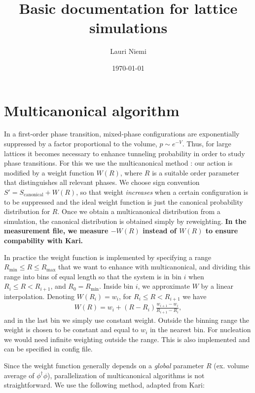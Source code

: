 \documentclass[11pt,a4paper]{article}
\title{Basic documentation for lattice simulations}
\author{Lauri Niemi}
\date{\today}
\newcommand\lauri[1]{{\color{myorange}#1}}
\begin{document}
\maketitle


\section{Multicanonical algorithm}

In a first-order phase transition, mixed-phase configurations are exponentially suppressed by a factor proportional to the volume, $p \sim e^{-V}$. Thus, for large lattices it becomes necessary to enhance tunneling probability in order to study phase transitions. For this we use the multicanonical method \cite{Berg:1991cf}: our action is modified by a weight function $W(R)$, where $R$ is a suitable order parameter that distinguishes all relevant phases. We choose sign convention $S' = S_\text{canonical} + W(R)$, so that weight \textit{increases} when a certain configuration is to be suppressed and the ideal weight function is just the canonical probability distribution for $R$. Once we obtain a multicanonical distribution from a simulation, the canonical distribution is obtained simply by reweighting. \textbf{In the measurement file, we measure $-W(R)$ instead of $W(R)$ to ensure compability with Kari.}

In practice the weight function is implemented by specifying a range $R_\text{min} \leq R \leq R_\text{max}$ that we want to enhance with multicanonical, and dividing this range into bins of equal length so that the system is in bin $i$ when $R_{i} \leq R < R_{i+1}$, and $R_0 = R_\text{min}$. Inside bin $i$, we approximate $W$ by a linear interpolation. Denoting $W(R_i) = w_i$, for $R_{i} \leq R < R_{i+1}$ we have 
\begin{align}
W(R) = w_i + (R - R_i) \frac{w_{i+1} - w_i}{R_{i+1} - R_i},
\end{align}
and in the last bin we simply use constant weight. Outside the binning range the weight is chosen to be constant and equal to $w_i$ in the nearest bin. \lauri{For nucleation we would need infinite weighting outside the range. This is also implemented and can be specified in config file.}

Since the weight function generally depends on a \textit{global} parameter $R$ (ex. volume average of $\phi^\dagger\phi$), parallelization of multicanonical algorithms is not straightforward. We use the following method, adapted from Kari: 
\end{document}
